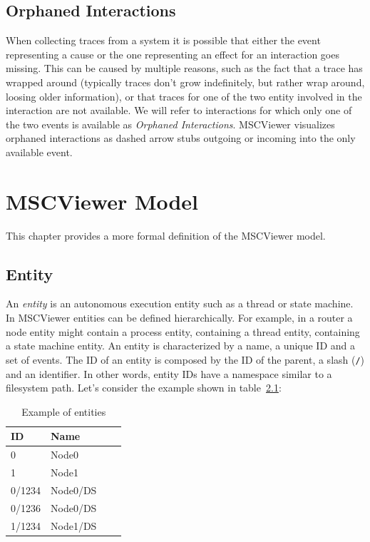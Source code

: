 \documentclass[11pt, twoside, titlepage]{book}
\newcommand{\prog}{MSCViewer}
\newcommand{\defterm}[1]{\textit{#1}\index{#1}}
\begin{document}
\section{Orphaned Interactions}
When collecting traces from a system it is possible that either the event
representing a cause or the one representing an effect for an interaction goes
missing. This can be caused by multiple reasons, such as the fact that a trace
has wrapped around (typically traces don't grow indefinitely, but rather wrap
around, loosing older information), or that traces for one of the two entity
involved in the interaction are not available. We will refer to interactions for
which only one of the two events is available as \defterm{Orphaned
Interactions}.
\prog{} visualizes orphaned interactions as dashed arrow stubs outgoing or
incoming into the only available event.


\chapter{\prog{} Model}
This chapter provides a more formal definition of the \prog{} model. 

\section {Entity}
An \defterm{entity} is an autonomous execution entity such as a thread or state
machine. In MSCViewer entities can be defined hierarchically. For example, in a
router a node entity might contain a process entity, containing  a thread
entity, containing a state machine entity. An entity is characterized by a name,
a unique ID and a set of events. The ID of an entity is composed by the ID of
the parent, a slash (\texttt{/}) and an identifier. In other words, entity IDs
have a namespace similar to a filesystem path.
Let's consider the example shown in table~\ref{tab:entities}:
 
\begin{center}
    \begin{table}[h]
    \centering
    \label{tab:entities}
    \begin{tabular}{ | l | l | l | l |}
    \hline
    ID & Name\\ 
    \hline
    0       & Node0 \\  
    1       & Node1 \\  
    0/1234  & Node0/DS \\
    0/1236  & Node0/DS \\
    1/1234  & Node1/DS \\
    \hline
    \end{tabular}
    \caption{Example of entities}
    \end{table}
\end{center}
\end{document}
